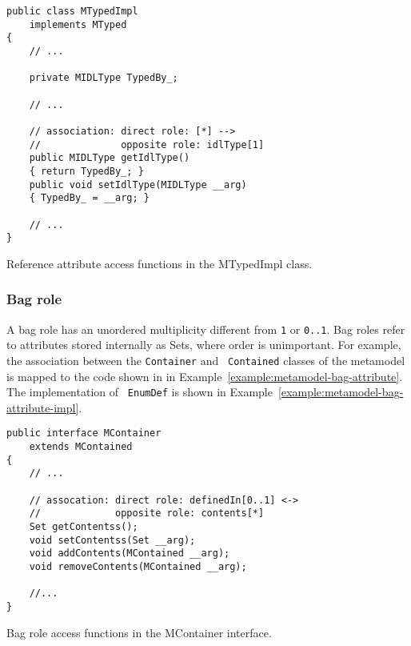 \begin{Example}
\begin{minifbox}
\begin{verbatim}
public class MTypedImpl
    implements MTyped
{
    // ...

    private MIDLType TypedBy_;

    // ...

    // association: direct role: [*] -->
    //              opposite role: idlType[1]
    public MIDLType getIdlType()
    { return TypedBy_; }
    public void setIdlType(MIDLType __arg)
    { TypedBy_ = __arg; }

    // ...
}
\end{verbatim}
\end{minifbox}
\caption{Reference attribute access functions in the MTypedImpl class.}
\label{example:metamodel-reference-attribute-impl}
\end{Example}

\subsubsection{Bag role}

A bag role has an unordered multiplicity different from {\tt 1} or {\tt 0..1}.
Bag roles refer to attributes stored internally as Sets, where order is
unimportant. For example, the association between the {\tt Container} and {\tt
Contained} classes of the metamodel is mapped to the code shown in in
Example~\ref{example:metamodel-bag-attribute}. The implementation of {\tt
EnumDef} is shown in Example~\ref{example:metamodel-bag-attribute-impl}.

\begin{Example}
\begin{minifbox}
\begin{verbatim}
public interface MContainer
    extends MContained
{
    // ...

    // assocation: direct role: definedIn[0..1] <->
    //             opposite role: contents[*]
    Set getContentss();
    void setContentss(Set __arg);
    void addContents(MContained __arg);
    void removeContents(MContained __arg);

    //...
}
\end{verbatim}
\end{minifbox}
\caption{Bag role access functions in the MContainer interface.}
\label{example:metamodel-bag-attribute}
\end{Example}

